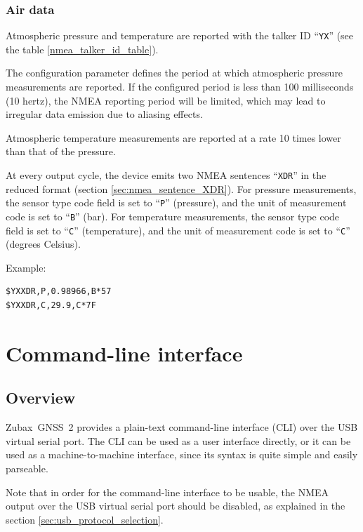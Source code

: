 \documentclass{zubaxdoc}
\begin{document}
\subsection{Air data}

Atmospheric pressure and temperature are reported with the talker ID ``\verb|YX|''
(see the table \ref{nmea_talker_id_table}).

The configuration parameter  defines the period at which atmospheric pressure measurements
are reported.
If the configured period is less than 100 milliseconds (10 hertz),
the NMEA reporting period will be limited,
which may lead to irregular data emission due to aliasing effects.

Atmospheric temperature measurements are reported at a rate 10 times lower than that of the pressure.

At every output cycle, the device emits two NMEA sentences ``\verb|XDR|'' in the reduced format
(section \ref{sec:nmea_sentence_XDR}).
For pressure measurements, the sensor type code field is set to ``\verb|P|'' (pressure),
and the unit of measurement code is set to ``\verb|B|'' (bar).
For temperature measurements, the sensor type code field is set to ``\verb|C|'' (temperature),
and the unit of measurement code is set to ``\verb|C|'' (degrees Celsius).

Example:
\begin{verbatim}
$YXXDR,P,0.98966,B*57
$YXXDR,C,29.9,C*7F
\end{verbatim}

%
%

\chapter{Command-line interface}\label{command-line_interface}

\section{Overview}

Zubax~GNSS~2 provides a plain-text command-line interface (CLI) over the USB virtual serial port.
The CLI can be used as a user interface directly,
or it can be used as a machine-to-machine interface,
since its syntax is quite simple and easily parseable.

Note that in order for the command-line interface to be usable,
the NMEA output over the USB virtual serial port should be disabled, as explained in
the section \ref{sec:usb_protocol_selection}.
\end{document}
